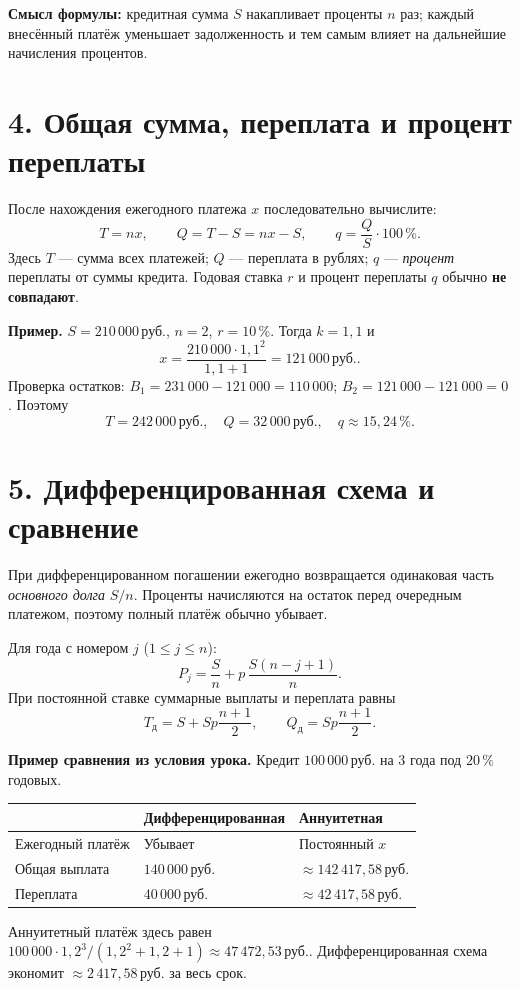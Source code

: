 \documentclass[a4paper,12pt]{article}
\newcommand{\key}[1]{\textcolor{darkaccent}{\textbf{#1}}}
\newcommand{\rub}{\,\text{руб.}}
\newcommand{\fboxeq}[1]{\[\boxed{#1}\]}
\newcommand{\pct}{\,\%}
\begin{document}
\textbf{Смысл формулы:} кредитная сумма $S$ накапливает проценты $n$ раз; каждый внесённый платёж уменьшает задолженность и тем самым влияет на дальнейшие начисления процентов.

\section*{4. Общая сумма, переплата и процент переплаты}
\enlargethispage{2\baselineskip}

После нахождения ежегодного платежа $x$ последовательно вычислите:
\[
\boxed{T=nx},\qquad
\boxed{Q=T-S=nx-S},\qquad
\boxed{q=\frac{Q}{S}\cdot100\pct}.
\]
Здесь $T$ --- сумма всех платежей; $Q$ --- переплата в рублях; $q$ --- \emph{процент} переплаты от суммы кредита. Годовая ставка $r$ и процент переплаты $q$ обычно \key{не совпадают}.

\textbf{Пример.} $S=210\,000\rub$, $n=2$, $r=10\pct$. Тогда $k=1{,}1$ и
\[
x=\frac{210\,000\cdot1{,}1^2}{1{,}1+1}=121\,000\rub.
\]
Проверка остатков: $B_1=231\,000-121\,000=110\,000$;
$B_2=121\,000-121\,000=0$. Поэтому
\[
T=242\,000\rub,\quad Q=32\,000\rub,\quad q\approx15{,}24\pct.
\]

\clearpage
\section*{5. Дифференцированная схема и сравнение}

При дифференцированном погашении ежегодно возвращается одинаковая часть \emph{основного долга} $S/n$. Проценты начисляются на остаток перед очередным платежом, поэтому полный платёж обычно убывает.

Для года с номером $j$ ($1\le j\le n$):
\[
P_j=\frac Sn+p\,\frac{S(n-j+1)}{n}.
\]
При постоянной ставке суммарные выплаты и переплата равны
\fboxeq{T_{\text{д}}=S+Sp\frac{n+1}{2},\qquad
Q_{\text{д}}=Sp\frac{n+1}{2}.}

\textbf{Пример сравнения из условия урока.} Кредит $100\,000\rub$ на $3$ года под $20\pct$ годовых.
\begin{center}
\renewcommand{\arraystretch}{1.25}
\begin{tabularx}{\linewidth}{@{}p{39mm}XX@{}}
\toprule
& \textbf{Дифференцированная} & \textbf{Аннуитетная} \\
\midrule
Ежегодный платёж & Убывает & Постоянный $x$\\
Общая выплата & $140\,000\rub$ & $\approx142\,417{,}58\rub$\\
Переплата & $40\,000\rub$ & $\approx42\,417{,}58\rub$\\
\bottomrule
\end{tabularx}
\end{center}
Аннуитетный платёж здесь равен $100\,000\cdot1{,}2^3/(1{,}2^2+1{,}2+1)\approx47\,472{,}53\rub$. Дифференцированная схема экономит $\approx2\,417{,}58\rub$ за весь срок.
\end{document}
